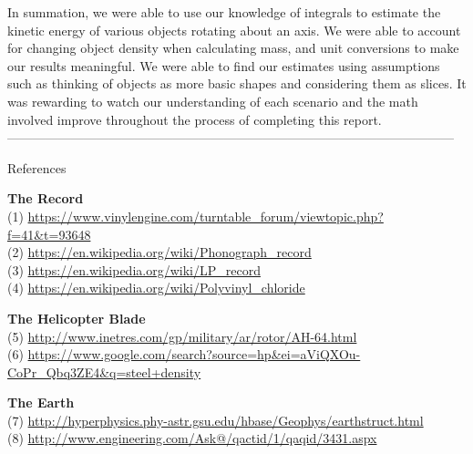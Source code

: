\documentclass[a4paper, 11pt, oneside]{book} %
\begin{document}
In summation, we were able to use our knowledge of integrals to estimate the kinetic energy of various objects rotating about an axis. We were able to account for changing object density when calculating mass, and unit conversions to make our results meaningful. We were able to find our estimates using assumptions such as thinking of objects as more basic shapes and considering them as slices. It was rewarding to watch our understanding of each scenario and the math involved improve throughout the process of completing this report. \\

\vspace{0.5\baselineskip} %
\vspace{0.5\baselineskip} %
---------------------------------------------------------------------------------------------------------
\vspace{0.5\baselineskip} %
\vspace{0.5\baselineskip} %

{\LARGE References \\} %
\vspace{0.5\baselineskip} %
\vspace{0.5\baselineskip} %

\textbf{The Record}\\
(1) \url{https://www.vinylengine.com/turntable_forum/viewtopic.php?f=41&t=93648}\\
(2) \url{https://en.wikipedia.org/wiki/Phonograph_record}\\
(3) \url{https://en.wikipedia.org/wiki/LP_record}\\
(4) \url{https://en.wikipedia.org/wiki/Polyvinyl_chloride}\\

\vspace{0.5\baselineskip} %
\vspace{0.5\baselineskip} %

\textbf{The Helicopter Blade}\\
(5) \url{http://www.inetres.com/gp/military/ar/rotor/AH-64.html}\\
(6) \url{https://www.google.com/search?source=hp&ei=aViQXOu-CoPr_Qbq3ZE4&q=steel+density}\\

\vspace{0.5\baselineskip} %
\vspace{0.5\baselineskip} %

\textbf{The Earth}\\
(7) \url{http://hyperphysics.phy-astr.gsu.edu/hbase/Geophys/earthstruct.html}\\
(8) \url{http://www.engineering.com/Ask@/qactid/1/qaqid/3431.aspx}\\
\end{document}
